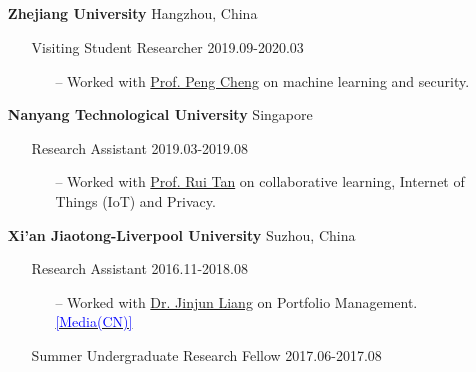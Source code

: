 \documentclass[11pt]{article}
\begin{document}
\subsection*{}
\begin{itemize}[leftmargin=0em, noitemsep, nolistsep]
    \setlength\itemsep{1em}
    \item[] \large\textbf{Zhejiang University} \hfill Hangzhou, China
        \begin{itemize}[noitemsep, nolistsep, leftmargin=0em]
            \item[] {Visiting Student Researcher} \hfill 2019.09-2020.03
             \begin{itemize}
                \small
                \item[--] Worked with \href{https://person.zju.edu.cn/en/cp}{Prof. Peng Cheng} on machine learning and security.
             \end{itemize}
        \end{itemize} 
    \item[] \large\textbf{Nanyang Technological University} \hfill Singapore
        \begin{itemize}[noitemsep, nolistsep, leftmargin=0em]
            \item[] Research Assistant \hfill 2019.03-2019.08
             \begin{itemize}
                \small
                \item[--] Worked with \href{https://www.ntu.edu.sg/home/tanrui/}{Prof. Rui Tan} on collaborative learning, Internet of Things (IoT) and Privacy.
             \end{itemize}
        \end{itemize} 
    \item[] \large\textbf{Xi'an Jiaotong-Liverpool University} \hfill Suzhou, China
        \begin{itemize}[noitemsep, nolistsep, leftmargin=0em]
            \item[] Research Assistant \hfill 2016.11-2018.08
             \begin{itemize}
                \small
                \item[--] Worked with \href{https://www.linkedin.com/in/kumkee}{Dr. Jinjun Liang} on Portfolio Management. \href{https://archive.is/XKqY3}{\textcolor{blue}{[Media(CN)]}}
             \end{itemize}
            \item[] Summer Undergraduate Research Fellow \hfill 2017.06-2017.08

\end{itemize}
\end{itemize}
\end{document}
